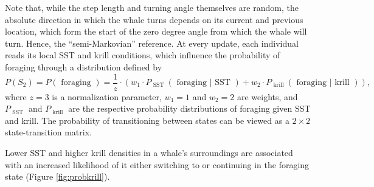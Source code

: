 \documentclass[11pt]{article}
\begin{document}
Note that, while the step length and turning angle themselves are random, the absolute direction in which the whale turns depends on its current and previous location, which form the start of the zero degree angle from which the whale will turn. Hence, the “semi-Markovian” reference. 
At every update, each individual reads its local SST and krill conditions, which influence the probability of foraging through a distribution defined by 
\begin{equation}P(S_2) = P(\text{ foraging }) = \frac 1 z \cdot (w_1\cdot P_{\text{ SST }}(\text{ foraging }|\text{ SST }) + w_2\cdot P_{\text{ krill }}(\text{ foraging }|\text{ krill }) ), \end{equation}
where $z=3$ is a normalization parameter, $w_1=1$ and $w_2=2$ are weights, and $P_{\text{ SST }}$ and $P_{\text{ krill }}$ are the respective probability distributions of foraging given SST and krill. The probability of transitioning between states can be viewed as a $2\times 2$ state-transition matrix. \par 

Lower SST and higher krill densities in a whale’s surroundings are associated with an increased likelihood of it either switching to or continuing in the foraging state (Figure \ref{fig:probkrill}).\par
\end{document}
